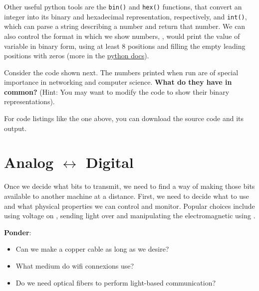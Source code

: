 Other useful python tools are the \texttt{bin()} and \texttt{hex()} functions, that convert an integer 
into its binary and hexadecimal representation, respectively, and \texttt{int()}, which can parse
a string describing a number and return that number. We can also control the format in which we show numbers,
\eg,  would print the value of variable  in binary form, 
using at least 8 positions and filling the empty leading positions with zeros
(more in the \href{https://docs.python.org/3/reference/lexical_analysis.html#f-strings}{python docs}).

\begin{exercise}
Consider the code shown next. The numbers printed when run are of special importance in networking and computer science.
\textbf{What do they have in common?} (Hint: You may want to modify the code to show their binary representations).
\end{exercise}
\begin{center}
\end{center}
\begin{remark}
For code listings like the one above, you can download the source code and its output.
\end{remark}


\section{Analog $\leftrightarrow$ Digital}\label{sec:piercing:analog_digital}

Once we decide what bits to transmit, we need to find a way of making those bits available to another machine at a distance.
First, we need to decide what  to use and what physical properties we can control and monitor.
Popular choices include using voltage on , sending light over  and manipulating the 
electromagnetic  using .

\begin{exercise} \textbf{Ponder}:\\[-0.5cm]
\begin{itemize}
\item Can we make a copper cable as long as we desire?
\item What medium do wifi connexions use? 
\item Do we need optical fibers to perform light-based communication?
\end{itemize}
\end{exercise}


